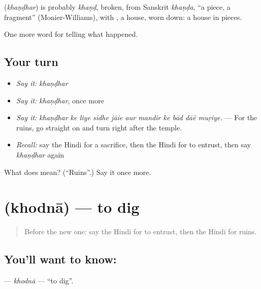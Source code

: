 \begin{cousinweb}
\textbf{} (\emph{khaṇḍhar}) is probably \emph{khaṇḍ}, broken, from Sanskrit \emph{khaṇḍa}, \textquotedblleft{}a piece, a fragment\textquotedblright{} (Monier-Williams), with \textbf{}, a house, worn down: a house in pieces.
\end{cousinweb}

\begin{grammarlens}[title={What you've built}]
One more word for telling what happened.
\end{grammarlens}

\subsection*{Your turn}
\begin{itemize}
\raggedright
  \item \emph{Say it:} \emph{khaṇḍhar}
  \item \emph{Say it:} \emph{khaṇḍhar}, once more
  \item \emph{Say it:} \emph{khaṇḍhar ke liye sīdhe jāie aur mandir ke bād dāẽ muṛiye.} — For the ruins, go straight on and turn right after the temple.
  \item \emph{Recall:} say the Hindi for a sacrifice, then the Hindi for to entrust, then say \emph{khaṇḍhar} again
\end{itemize}

\begin{tcolorbox}[breakable,colback=teal!4,colframe=teal!35!black,title={Before you move on}]
What does  mean? (\textquotedblleft{}Ruins\textquotedblright{}.) Say it once more.
\end{tcolorbox}
\section[\texorpdfstring{\hi{खोदना} (khodnā)}{खोदना (khodnā)}]{ (khodnā) — to dig}

\label{lesson:HI-C326-khodna}



\begin{quote}
Before the new one: say the Hindi for to entrust, then the Hindi for ruins.
\end{quote}

\subsection*{You'll want to know: }
\textbf{} — \emph{khodnā} — \textquotedblleft{}to dig\textquotedblright{}.

